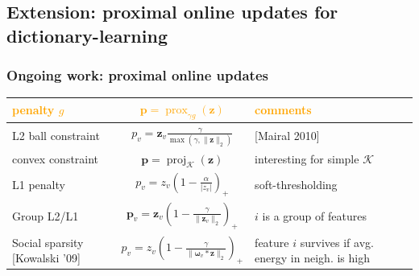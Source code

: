 \documentclass{beamer}
\def\B#1{\mathbf{#1}}
\def\emph#1{\textbf{\textcolor{orange}{#1}}}
\DeclareMathOperator{\prox}{prox}
\DeclareMathOperator{\proj}{proj}
\newcommand{\mycite}[1]{\textcolor{myblue}{[#1]}}
\begin{document}
\subsection{Extension: proximal online updates for dictionary-learning}
\begin{frame}
  \frametitle{Ongoing work: proximal online updates }
  \vspace{-2em}
\begin{table}[H]
  \begin{tabular}{p{}|c|p{13cm}}\hline
    \emph{penalty $g$} & \emph{$\B{p} = \prox_{\gamma g}(\B{z})$} & \emph{comments}\\\hline
    L2 ball constraint & $p_v = \B{z}_v\frac{\gamma}{\max(\gamma,\|\B{z}\|_2)}$ & \mycite{Mairal 2010}\\ \hline
    convex constraint & $\B{p} = \proj_{\mathcal K}(\B{z})$ & interesting for simple $\mathcal K$\\ \hline
    L1 penalty & $p_v = z_v\left(1 - \frac{\alpha}{|z_v|}\right)_+$ & soft-thresholding \\\hline
    Group L2/L1 & $\B{p}_v = \B{z}_v\left(1 - \frac{\gamma}{\|\B{z}_v\|_2}\right)_+$ & $i$ is a group of features\\\hline
    Social sparsity \newline \mycite{Kowalski '09} & $p_v = z_v\left(1 - \frac{\gamma}{\|\boldsymbol{\omega}_v * \B{z}\|_2}\right)_+$
                                                    & feature $i$ survives if avg. \newline energy in neigh. is high\\\hline
  \end{tabular}
\end{table}


\end{frame}
\end{document}
